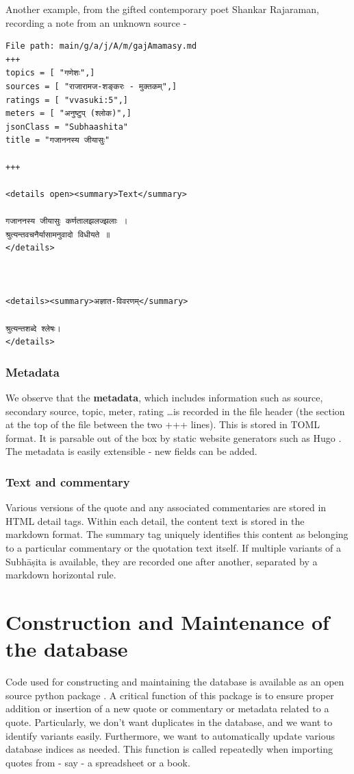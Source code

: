 \documentclass[11pt]{article}
\begin{document}
Another example, from the gifted contemporary poet Shankar Rajaraman, recording a note from an unknown source - 

\begin{verbatim}
File path: main/g/a/j/A/m/gajAmamasy.md
+++
topics = [ "गणेशः",]
sources = [ "राजारामज-शङ्करः - मुक्तकम्",]
ratings = [ "vvasuki:5",]
meters = [ "अनुष्टुप् (श्लोक)",]
jsonClass = "Subhaashita"
title = "गजाननस्य जीयासुः"

+++

<details open><summary>Text</summary>

गजाननस्य जीयासुः कर्णतालझलज्झलाः ।  
श्रुत्यन्तवचनैर्यासामनुवादो विधीयते ॥
</details>



<details><summary>अज्ञात-विवरणम्</summary>

श्रुत्यन्तशब्दे श्लेषः।
</details>
\end{verbatim}

\subsubsection{Metadata}
We observe that the \textbf{metadata}, which includes information such as source, secondary source, topic, meter, rating \ldots is recorded in the file header (the section at the top of the file between the two +++ lines). This is stored in TOML \cite{toml} format. It is parsable out of the box by static website generators such as Hugo \cite{Hugo}. The metadata is easily extensible - new fields can be added.

\subsubsection{Text and commentary}
Various versions of the quote and any associated commentaries are stored in HTML detail tags. Within each detail, the content text is stored in the markdown format. The summary tag uniquely identifies this content as belonging to a particular commentary or the quotation text itself. If multiple variants of a Subhāṣita is available, they are recorded one after another, separated by a markdown horizontal rule.

\section{Construction and Maintenance of the database}
Code used for constructing and maintaining the database is available as an open source python package \cite{subhaashita_py}. A critical function of this package is to ensure proper addition or insertion of a new quote or commentary or metadata related to a quote. Particularly, we don't want duplicates in the database, and we want to identify variants easily. Furthermore, we want to automatically update various database indices as needed. This function is called repeatedly when importing quotes from - say - a spreadsheet or a book.
\end{document}

